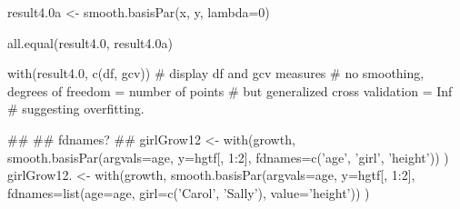 \documentclass{article}
\begin{document}
\begin{Examples}
\begin{ExampleCode}
result4.0a <- smooth.basisPar(x, y, lambda=0)

all.equal(result4.0, result4.0a)


with(result4.0, c(df, gcv)) #  display df and gcv measures
# no smoothing, degrees of freedom = number of points 
# but generalized cross validation = Inf
# suggesting overfitting.  

##
## fdnames?
##
girlGrow12 <- with(growth, smooth.basisPar(argvals=age, y=hgtf[, 1:2],
              fdnames=c('age', 'girl', 'height')) ) 
girlGrow12. <- with(growth, smooth.basisPar(argvals=age, y=hgtf[, 1:2],
    fdnames=list(age=age, girl=c('Carol', 'Sally'), value='height')) )

\end{ExampleCode}
\end{Examples}
\end{document}
